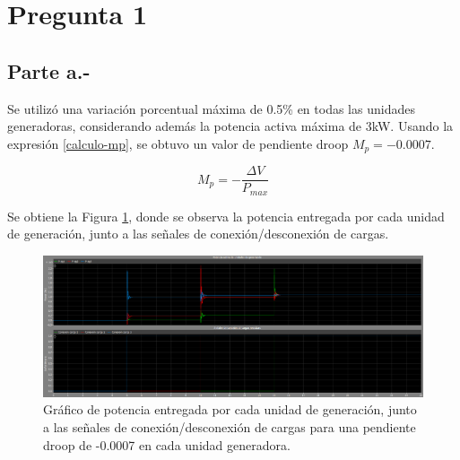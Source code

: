%
%


\newcommand{\explorelite}{\textit{explore\_lite}}
\newcommand{\movebase}{\textit{move\_base}}



\section{Pregunta 1}

\subsection{Parte a.-}

Se utilizó una variación porcentual máxima de 0.5\% en todas las unidades generadoras, considerando además la potencia activa máxima de 3kW. Usando la expresión \ref{calculo-mp}, se obtuvo un valor de pendiente droop $M_p = -0.0007$. 

\begin{equation}
    M_p = -\frac{\Delta V}{P_{max}}
    \label{calculo-mp}
\end{equation}

Se obtiene la Figura \ref{conexion-desconexion-potencia-dgs}, donde se observa la potencia entregada por cada unidad de generación, junto a las señales de conexión/desconexión de cargas.

\begin{figure}
    \centering
    \includegraphics[width=1.0\linewidth]{Tarea 2/report/imagenes/p1a/conexion-desconexion-potencia-dgs.png}
    \caption{Gráfico de potencia entregada por cada unidad de generación, junto a las señales de conexión/desconexión de cargas para una pendiente droop de -0.0007 en cada unidad generadora.}
    \label{conexion-desconexion-potencia-dgs}
\end{figure}

